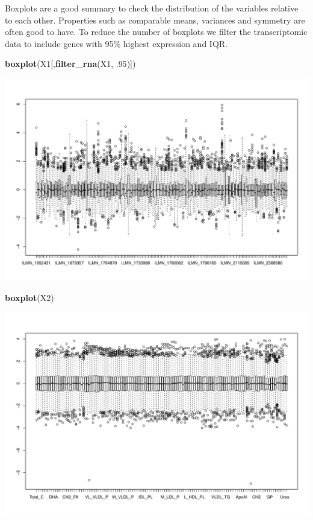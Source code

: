 \documentclass[]{article}
\newenvironment{Shaded}{\begin{snugshade}}{\end{snugshade}}
\newcommand{\KeywordTok}[1]{\textcolor[rgb]{0.13,0.29,0.53}{\textbf{{#1}}}}
\newcommand{\DecValTok}[1]{\textcolor[rgb]{0.00,0.00,0.81}{{#1}}}
\newcommand{\NormalTok}[1]{{#1}}
\begin{document}
Boxplots are a good summary to check the distribution of the variables
relative to each other. Properties such as comparable means, variances
and symmetry are often good to have. To reduce the number of boxplots we
filter the transcriptomic data to include genes with 95\% highest
expression and IQR.

\begin{Shaded}
\begin{Highlighting}[]
\KeywordTok{boxplot}\NormalTok{(X1[,}\KeywordTok{filter_rna}\NormalTok{(X1, .}\DecValTok{95}\NormalTok{)])}
\end{Highlighting}
\end{Shaded}

\includegraphics{Figs/Boxplots-1.pdf}

\begin{Shaded}
\begin{Highlighting}[]
\KeywordTok{boxplot}\NormalTok{(X2)}
\end{Highlighting}
\end{Shaded}

\includegraphics{Figs/Boxplots-2.pdf}
\end{document}
